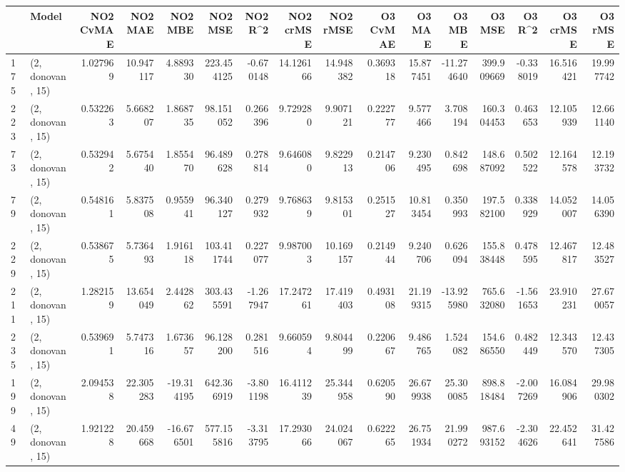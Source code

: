 \begin{tabular}{llrrrrrrrrrrrrrr}
\toprule
{} &             Model &  NO2 CvMAE &    NO2 MAE &    NO2 MBE &      NO2 MSE &    NO2 R\textasciicircum2 &  NO2 crMSE &   NO2 rMSE &  O3 CvMAE &     O3 MAE &     O3 MBE &       O3 MSE &    O3 R\textasciicircum2 &   O3 crMSE &    O3 rMSE \\
\midrule
175 &  (2, donovan, 15) &   1.027969 &  10.947117 &   4.889330 &   223.454125 &  -0.670148 &  14.126166 &  14.948382 &  0.369318 &  15.877451 & -11.274640 &   399.909669 & -0.338019 &  16.516421 &  19.997742 \\
223 &  (2, donovan, 15) &   0.532263 &   5.668207 &   1.868735 &    98.151052 &   0.266396 &   9.729280 &   9.907121 &  0.222777 &   9.577466 &   3.708194 &   160.304453 &  0.463653 &  12.105939 &  12.661140 \\
73  &  (2, donovan, 15) &   0.532942 &   5.675440 &   1.855470 &    96.489628 &   0.278814 &   9.646080 &   9.822913 &  0.214706 &   9.230495 &   0.842698 &   148.687092 &  0.502522 &  12.164578 &  12.193732 \\
79  &  (2, donovan, 15) &   0.548161 &   5.837508 &   0.955941 &    96.340127 &   0.279932 &   9.768639 &   9.815301 &  0.251527 &  10.813454 &   0.350993 &   197.582100 &  0.338929 &  14.052007 &  14.056390 \\
229 &  (2, donovan, 15) &   0.538675 &   5.736493 &   1.916118 &   103.411744 &   0.227077 &   9.987003 &  10.169157 &  0.214944 &   9.240706 &   0.626094 &   155.838448 &  0.478595 &  12.467817 &  12.483527 \\
211 &  (2, donovan, 15) &   1.282159 &  13.654049 &   2.442862 &   303.435591 &  -1.267947 &  17.247261 &  17.419403 &  0.493108 &  21.199315 & -13.925980 &   765.632080 & -1.561653 &  23.910231 &  27.670057 \\
235 &  (2, donovan, 15) &   0.539691 &   5.747316 &   1.673657 &    96.128200 &   0.281516 &   9.660594 &   9.804499 &  0.220667 &   9.486765 &   1.524082 &   154.686550 &  0.482449 &  12.343570 &  12.437305 \\
199 &  (2, donovan, 15) &   2.094538 &  22.305283 & -19.314195 &   642.366919 &  -3.801198 &  16.411239 &  25.344958 &  0.620590 &  26.679938 &  25.300085 &   898.818484 & -2.007269 &  16.084906 &  29.980302 \\
49  &  (2, donovan, 15) &   1.921228 &  20.459668 & -16.676501 &   577.155816 &  -3.313795 &  17.293066 &  24.024067 &  0.622265 &  26.751934 &  21.990272 &   987.693152 & -2.304626 &  22.452641 &  31.427586 \\

\end{tabular}
